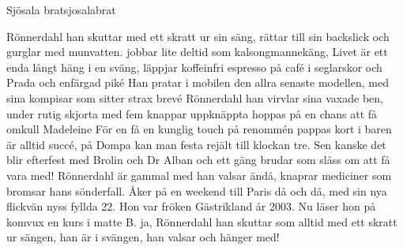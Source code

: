 \begin{song}{Sjösala brat}{sjosalabrat}
\begin{vers}
Rönnerdahl han skuttar med ett skratt ur sin säng, 
rättar till sin backslick och gurglar med munvatten.
jobbar lite deltid som kalsongmannekäng,
Livet är ett enda långt häng i en sväng,
läppjar koffeinfri espresso på café
i seglarskor och Prada och enfärgad piké
Han pratar i mobilen den allra senaste modellen,
med sina kompisar som sitter strax brevé
Rönnerdahl han virvlar sina vaxade ben, 
under rutig skjorta med fem knappar uppknäppta
hoppas på en chans att få omkull Madeleine
För en få en kunglig touch på renommén
pappas kort i baren är alltid succé,
på Dompa kan man festa rejält till klockan tre.
Sen kanske det blir efterfest med Brolin och Dr Alban
och ett gäng brudar som slåss om att få vara med!
Rönnerdahl är gammal med han valsar ändå, 
knaprar mediciner som bromsar hans sönderfall.
Åker på en weekend till Paris då och då,
med sin nya flickvän nyss fyllda 22. 
Hon var fröken Gästrikland år 2003.
Nu läser hon på komvux en kurs i matte B.
ja, Rönnerdahl han skuttar som alltid med ett skratt 
ur sängen, han är i svängen, han valsar och hänger med!
\end{vers}
\end{song}
